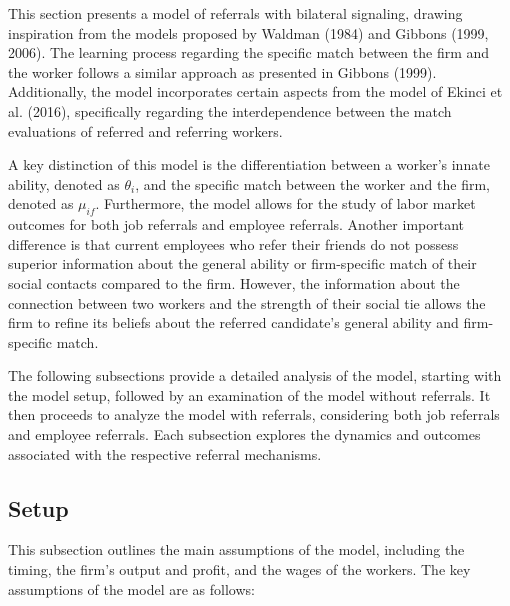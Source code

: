 \documentclass[12pt]{article}
\begin{document}
This section presents a model of referrals with bilateral signaling, drawing inspiration from the models proposed by Waldman (1984) and Gibbons (1999, 2006). The learning process regarding the specific match between the firm and the worker follows a similar approach as presented in Gibbons (1999). Additionally, the model incorporates certain aspects from the model of Ekinci et al. (2016), specifically regarding the interdependence between the match evaluations of referred and referring workers.

A key distinction of this model is the differentiation between a worker's innate ability, denoted as $\theta_i$, and the specific match between the worker and the firm, denoted as $\mu_{if}$. Furthermore, the model allows for the study of labor market outcomes for both job referrals and employee referrals. Another important difference is that current employees who refer their friends do not possess superior information about the general ability or firm-specific match of their social contacts compared to the firm. However, the information about the connection between two workers and the strength of their social tie allows the firm to refine its beliefs about the referred candidate's general ability and firm-specific match. 

The following subsections provide a detailed analysis of the model, starting with the model setup, followed by an examination of the model without referrals. It then proceeds to analyze the model with referrals, considering both job referrals and employee referrals. Each subsection explores the dynamics and outcomes associated with the respective referral mechanisms.

\subsection{Setup}
This subsection outlines the main assumptions of the model, including the timing, the firm's output and profit, and the wages of the workers. The key assumptions of the model are as follows:
\end{document}
